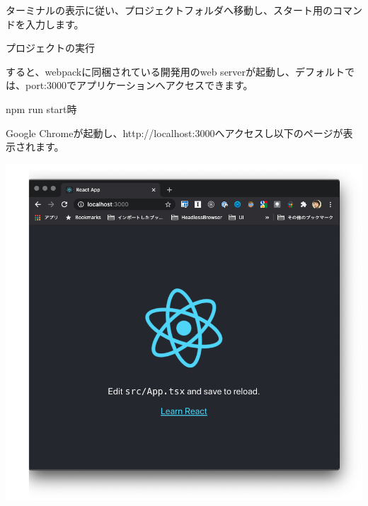 ターミナルの表示に従い、プロジェクトフォルダへ移動し、スタート用のコマンドを入力します。

\def\startercodeblockfontsize{}
\begin{starterterminal}[]{プロジェクトの実行}\end{starterterminal}

すると、webpackに同梱されている開発用のweb serverが起動し、デフォルトでは、port:3000でアプリケーションへアクセスできます。

\def\startercodeblockfontsize{}
\begin{starterterminal}[]{npm run start時}\end{starterterminal}

Google Chromeが起動し、http://localhost:3000へアクセスし以下のページが表示されます。

\begin{reviewimage}[H]%
\includegraphics[width=1.0\maxwidth]{./images/02-create-react-app/02_cra_start.png}%
\label{image:02-create-react-app:02_cra_start}
\end{reviewimage}

